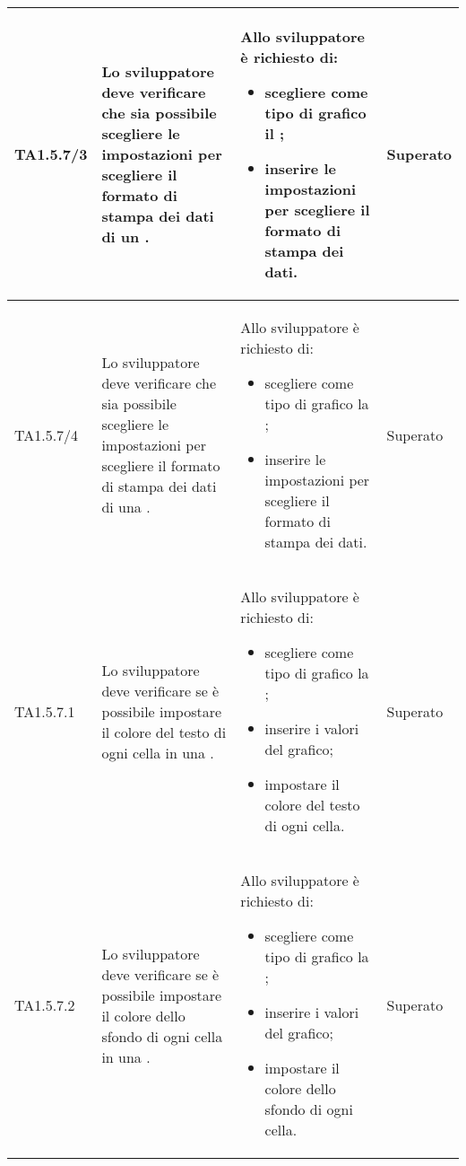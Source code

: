 \begin{longtabu}{| X[0.5] | X | X | X[0.5] |}
	TA1.5.7/3 & Lo sviluppatore deve verificare che sia possibile scegliere le impostazioni per scegliere il formato di stampa dei dati di un .

		& Allo sviluppatore è richiesto di:
		\begin{itemize}
			\item scegliere come tipo di grafico il ;
			\item inserire le impostazioni per scegliere il formato di stampa dei dati.
		\end{itemize}
& Superato \\ \hline

	TA1.5.7/4 & Lo sviluppatore deve verificare che sia possibile scegliere le impostazioni per scegliere il formato di stampa dei dati di una .

		& Allo sviluppatore è richiesto di:
		\begin{itemize}
			\item scegliere come tipo di grafico la ;
			\item inserire le impostazioni per scegliere il formato di stampa dei dati.
		\end{itemize}
& Superato \\ \hline

	TA1.5.7.1 & Lo sviluppatore deve verificare se è possibile impostare il colore del testo di ogni cella in una .

		& Allo sviluppatore è richiesto di:
		\begin{itemize}
			\item scegliere come tipo di grafico la ;
			\item inserire i valori del grafico;
			\item impostare il colore del testo di ogni cella.
		\end{itemize}
& Superato \\ \hline

	TA1.5.7.2 & Lo sviluppatore deve verificare se è possibile impostare il colore dello sfondo di ogni cella in una .

		& Allo sviluppatore è richiesto di:
		\begin{itemize}
			\item scegliere come tipo di grafico la ;
			\item inserire i valori del grafico;
			\item impostare il colore dello sfondo di ogni cella.
		\end{itemize}
& Superato \\ \hline


\end{longtabu}
